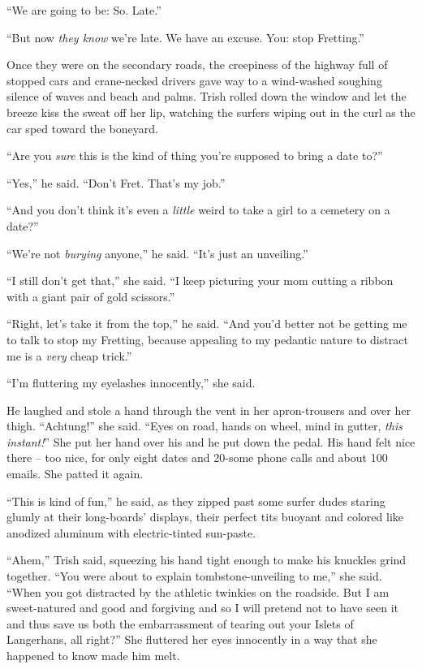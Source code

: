 “We are going to be: So. Late.”

“But now \emph{they know} we're late. We have an excuse. You: stop 
Fretting.”

\tb

Once they were on the secondary roads, the creepiness of the highway 
full of stopped cars and crane-necked drivers gave way to a wind-washed 
soughing silence of waves and beach and palms. Trish rolled down the 
window and let the breeze kiss the sweat off her lip, watching the 
surfers wiping out in the curl as the car sped toward the boneyard.

“Are you \emph{sure} this is the kind of thing you're supposed to 
bring a date to?”

“Yes,” he said. “Don't Fret. That's my job.”

“And you don't think it's even a \emph{little} weird to take a girl 
to a cemetery on a date?”

“We're not \emph{burying} anyone,” he said. “It's just an 
unveiling.”

“I still don't get that,” she said. “I keep picturing your mom 
cutting a ribbon with a giant pair of gold scissors.”

“Right, let's take it from the top,” he said. “And you'd better 
not be getting me to talk to stop my Fretting, because appealing to my 
pedantic nature to distract me is a \emph{very} cheap trick.”

“I'm fluttering my eyelashes innocently,” she said.

He laughed and stole a hand through the vent in her apron-trousers and 
over her thigh. “Achtung!” she said. “Eyes on road, hands on 
wheel, mind in gutter, \emph{this instant!}” She put her hand over 
his and he put down the pedal. His hand felt nice there -- too nice, 
for only eight dates and 20-some phone calls and about 100 emails. She 
patted it again.

“This is kind of fun,” he said, as they zipped past some surfer 
dudes staring glumly at their long-boards' displays, their perfect tits 
buoyant and colored like anodized aluminum with electric-tinted 
sun-paste.

“Ahem,” Trish said, squeezing his hand tight enough to make his 
knuckles grind together. “You were about to explain 
tombstone-unveiling to me,” she said. “When you got distracted by 
the athletic twinkies on the roadside. But I am sweet-natured and good 
and forgiving and so I will pretend not to have seen it and thus save 
us both the embarrassment of tearing out your Islets of Langerhans, all 
right?” She fluttered her eyes innocently in a way that she happened 
to know made him melt.

